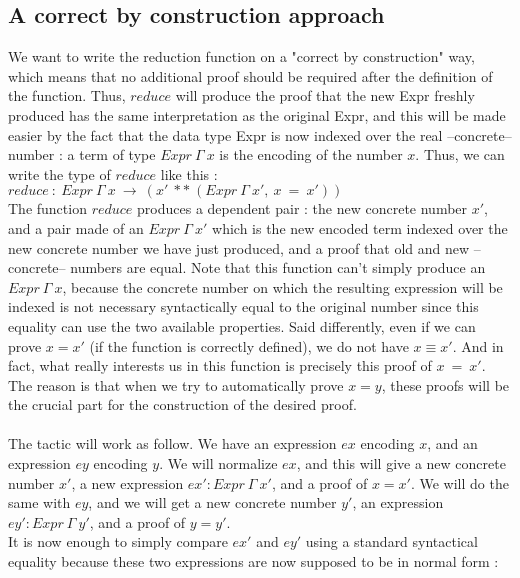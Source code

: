 \subsection{A correct by construction approach}

We want to write the reduction function on a "correct by construction" way, which means that no additional proof should be required after the definition of the function. Thus, $reduce$ will produce the proof that the new Expr freshly produced has the same interpretation as the original Expr, and this will be made easier by the fact that the data type Expr is now indexed over the real --concrete-- number : a term of type $Expr\ \Gamma\ x$ is the encoding of the number $x$.
Thus, we can write the type of $reduce$ like this : \\
$reduce\ :\ Expr\ \Gamma\ x\ \rightarrow\ (x'\ **\ (Expr\ \Gamma\ x',\ x\ =\ x'))$ \\
The function $reduce$ produces a dependent pair : the new concrete number $x'$, and a pair made of an $Expr\ \Gamma\ x'$ which is the new encoded term indexed over the new concrete number we have just produced, and a proof that old and new --concrete-- numbers are equal.
Note that this function can't simply produce an $Expr\ \Gamma\ x$, because the concrete number on which the resulting expression will be indexed is not necessary syntactically equal to the original number since this equality can use the two available properties. Said differently, even if we can prove $x=x'$ (if the function is correctly defined), we do not have $x \equiv x'$.
And in fact, what really interests us in this function is precisely this proof of $x\ =\ x'$.
The reason is that when we try to automatically prove $x=y$, these proofs will be the crucial part for the construction of the desired proof. \\
\\
The tactic will work as follow.
We have an expression $ex$ encoding $x$, and an expression $ey$ encoding $y$. We will normalize $ex$, and this will give a new concrete number $x'$, a new expression $ex':Expr\ \Gamma\ x'$, and a proof of $x=x'$. We will do the same with $ey$, and we will get a new concrete number $y'$, an expression $ey':Expr\ \Gamma\ y'$, and a proof of $y=y'$. \\
It is now enough to simply compare $ex'$ and $ey'$ using a standard syntactical equality because these two expressions are now supposed to be in normal form :

